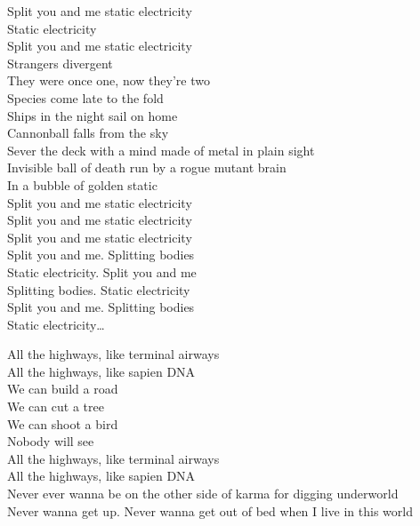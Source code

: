 Split you and me static electricity \\
Static electricity \\
Split you and me static electricity \\

Strangers divergent \\
They were once one, now they're two \\
Species come late to the fold \\
Ships in the night sail on home \\
Cannonball falls from the sky \\
Sever the deck with a mind made of metal in plain sight \\
Invisible ball of death run by a rogue mutant brain \\
In a bubble of golden static \\

Split you and me static electricity \\
Split you and me static electricity \\
Split you and me static electricity \\

Split you and me. Splitting bodies \\
Static electricity. Split you and me \\
Splitting bodies. Static electricity \\
Split you and me. Splitting bodies \\
Static electricity… \\




All the highways, like terminal airways \\
All the highways, like sapien DNA \\

We can build a road \\
We can cut a tree \\
We can shoot a bird \\
Nobody will see \\

All the highways, like terminal airways \\
All the highways, like sapien DNA \\

Never ever wanna be on the other side of karma for digging underworld \\
Never wanna get up. Never wanna get out of bed when I live in this world \\

